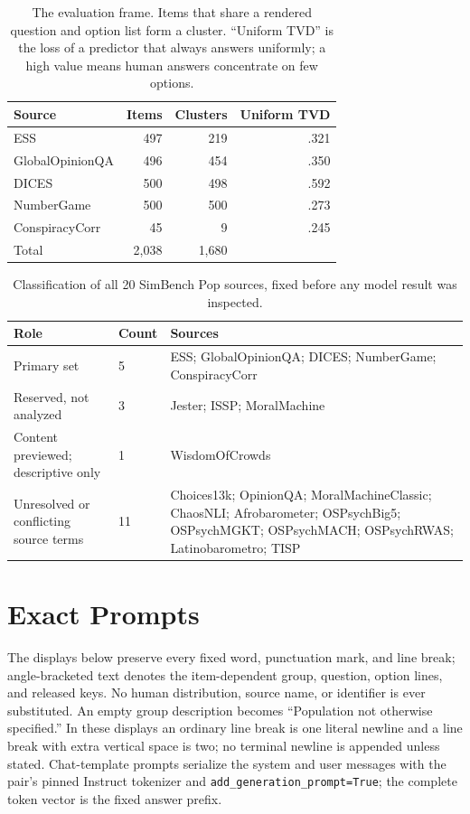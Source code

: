 \documentclass[11pt]{article}
\begin{document}
\begin{table}[t]
\centering\small
\setlength{\tabcolsep}{4pt}
\begin{tabular}{@{}lrrr@{}}
\toprule
Source & Items & Clusters & Uniform TVD \\
\midrule
ESS & 497 & 219 & .321 \\
GlobalOpinionQA & 496 & 454 & .350 \\
DICES & 500 & 498 & .592 \\
NumberGame & 500 & 500 & .273 \\
ConspiracyCorr & 45 & 9 & .245 \\
\midrule
Total & 2,038 & 1,680 & \\
\bottomrule
\end{tabular}
\caption{The evaluation frame. Items that share a rendered question and option
list form a cluster. ``Uniform TVD'' is the loss of a predictor that always
answers uniformly; a high value means human answers concentrate on few
options.}
\label{tab:frame}
\end{table}


\begin{table}[t]
\centering
\small
\setlength{\tabcolsep}{5pt}
\begin{tabular}{@{}p{}p{}p{}@{}}
\toprule
Role & Count & Sources \\
\midrule
Primary set & 5 & ESS; GlobalOpinionQA; DICES; NumberGame; ConspiracyCorr \\
Reserved, not analyzed & 3 & Jester; ISSP; MoralMachine \\
Content previewed; descriptive only & 1 & WisdomOfCrowds \\
Unresolved or conflicting source terms & 11 & Choices13k; OpinionQA;
MoralMachineClassic; ChaosNLI; Afrobarometer; OSPsychBig5; OSPsychMGKT;
OSPsychMACH; OSPsychRWAS; Latinobarometro; TISP \\
\bottomrule
\end{tabular}
\caption{Classification of all 20 SimBench Pop sources, fixed before any model
result was inspected.}
\label{tab:source-dispositions}
\end{table}

\section{Exact Prompts}
\label{app:prompts}


The displays below preserve every fixed word, punctuation mark, and line
break; angle-bracketed text denotes the item-dependent group, question, option
lines, and released keys. No human distribution, source name, or identifier is
ever substituted. An empty group description becomes ``Population not
otherwise specified.'' In these displays an ordinary line break is one literal
newline and a line break with extra vertical space is two; no terminal newline
is appended unless stated. Chat-template prompts serialize the system and user
messages with the pair's pinned Instruct tokenizer and
\texttt{add\_generation\_prompt=True}; the complete token vector is the fixed
answer prefix.
\end{document}
